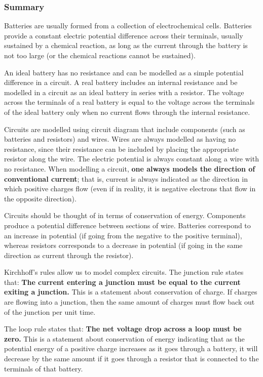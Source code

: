 \subsubsection{Summary}

Batteries are usually formed from a collection of electrochemical cells. Batteries provide a constant electric potential difference across their terminals, usually sustained by a chemical reaction, as long as the current through the battery is not too large (or the chemical reactions cannot be sustained).

An ideal battery has no resistance and can be modelled as a simple potential difference in a circuit. A real battery includes an internal resistance and be modelled in a circuit as an ideal battery in series with a resistor. The voltage across the terminals of a real battery is equal to the voltage across the terminals of the ideal battery only when no current flows through the internal resistance.

Circuits are modelled using circuit diagram that include components (such as batteries and resistors) and wires. Wires are always modelled as having no resistance, since their resistance can be included by placing the appropriate resistor along the wire. The electric potential is always constant along a wire with no resistance. When modelling a circuit, \textbf{one always models the direction of conventional current}; that is, current is always indicated as the direction in which positive charges flow (even if in reality, it is negative electrons that flow in the opposite direction).

Circuits should be thought of in terms of conservation of energy. Components produce a potential difference between sections of wire. Batteries correspond to an increase in potential (if going from the negative to the positive terminal), whereas resistors corresponds to a decrease in potential (if going in the same direction as current through the resistor).

Kirchhoff's rules allow us to model complex circuits. The junction rule states that: \textbf{The current entering a junction must be equal to the current exiting a junction.} This is a statement about conservation of charge. If charges are flowing into a junction, then the same amount of charges must flow back out of the junction per unit time.

The loop rule states that: \textbf{The net voltage drop across a loop must be zero.} This is a statement about conservation of energy indicating that as the potential energy of a positive charge increases as it goes through a battery, it will decrease by the same amount if it goes through a resistor that is connected to the terminals of that battery.

